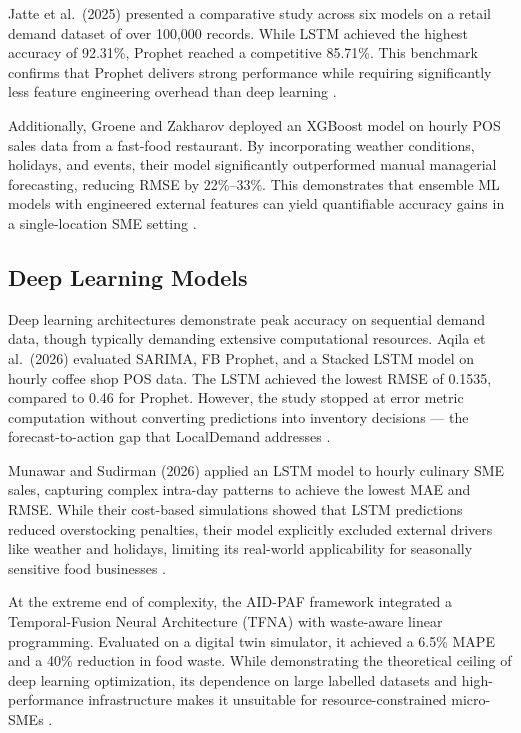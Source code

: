 \documentclass[conference]{IEEEtran}
\begin{document}
Jatte et al.\ (2025) presented a comparative study across six models on a 
retail demand dataset of over 100{,}000 records. While LSTM achieved the 
highest accuracy of 92.31\%, Prophet reached a competitive 85.71\%. This 
benchmark confirms that Prophet delivers strong performance while requiring 
significantly less feature engineering overhead than deep learning 
\cite{jatte2025}. 

Additionally, Groene and Zakharov deployed an XGBoost model on hourly POS 
sales data from a fast-food restaurant. By incorporating weather conditions, 
holidays, and events, their model significantly outperformed manual managerial 
forecasting, reducing RMSE by 22\%--33\%. This demonstrates that ensemble ML 
models with engineered external features can yield quantifiable accuracy gains 
in a single-location SME setting \cite{groene_zakharov}.

\subsection{Deep Learning Models}

Deep learning architectures demonstrate peak accuracy on sequential demand 
data, though typically demanding extensive computational resources. Aqila 
et al.\ (2026) evaluated SARIMA, FB Prophet, and a Stacked LSTM model on 
hourly coffee shop POS data. The LSTM achieved the lowest RMSE of 0.1535, 
compared to 0.46 for Prophet. However, the study stopped at error metric 
computation without converting predictions into inventory decisions --- the 
forecast-to-action gap that LocalDemand addresses \cite{aqila2026}.

Munawar and Sudirman (2026) applied an LSTM model to hourly culinary SME 
sales, capturing complex intra-day patterns to achieve the lowest MAE and RMSE. 
While their cost-based simulations showed that LSTM predictions reduced 
overstocking penalties, their model explicitly excluded external drivers like 
weather and holidays, limiting its real-world applicability for seasonally 
sensitive food businesses \cite{munawar2026}.

At the extreme end of complexity, the AID-PAF framework integrated a 
Temporal-Fusion Neural Architecture (TFNA) with waste-aware linear programming. 
Evaluated on a digital twin simulator, it achieved a 6.5\% MAPE and a 40\% 
reduction in food waste. While demonstrating the theoretical ceiling of 
deep learning optimization, its dependence on large labelled datasets and 
high-performance infrastructure makes it unsuitable for resource-constrained 
micro-SMEs \cite{aidpaf}.
\end{document}
